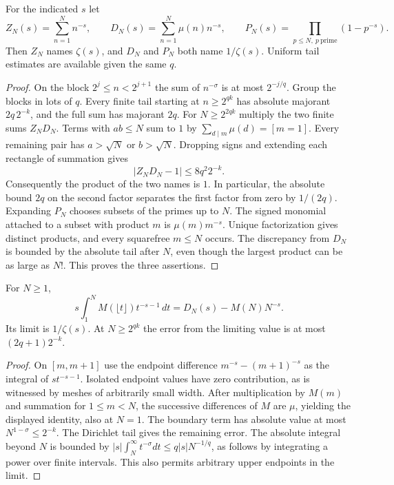 \begin{theorem}
For the indicated $s$ let
\[
 Z_N(s)=\sum_{n=1}^N n^{-s},\qquad
 D_N(s)=\sum_{n=1}^N\mu(n)n^{-s},\qquad
 P_N(s)=\prod_{p\le N,\ p\ \mathrm{prime}}(1-p^{-s}).
\]
Then $Z_N$ names $\zeta(s)$, and $D_N$ and $P_N$ both name
$1/\zeta(s)$. Uniform tail estimates are available given the same $q$.
\end{theorem}
\begin{proof}
On the block $2^j\le n<2^{j+1}$ the sum of $n^{-\sigma}$ is at
most $2^{-j/q}$. Group the blocks in lots of $q$. Every finite tail
starting at $n\ge2^{qk}$ has absolute majorant $2q\,2^{-k}$,
and the full sum has majorant $2q$. For $N\ge2^{2qk}$ multiply
the two finite sums $Z_N D_N$. Terms with $ab\le N$ sum to $1$ by
$\sum_{d\mid m}\mu(d)=[m=1]$. Every remaining pair has
$a>\sqrt N$ or $b>\sqrt N$. Dropping signs and extending each
rectangle of summation gives
\[
                 |Z_N D_N-1|\le 8q^2 2^{-k}.
\]
Consequently the product of the two names is $1$. In particular, the
absolute bound $2q$ on the second factor separates the first factor
from zero by $1/(2q)$. Expanding $P_N$ chooses subsets of the primes
up to $N$. The signed monomial attached to a subset with product $m$
is $\mu(m)m^{-s}$. Unique factorization gives distinct products,
and every squarefree $m\le N$ occurs. The discrepancy from $D_N$
is bounded by the absolute tail after $N$, even though the largest
product can be as large as $N!$. This proves the three assertions.
\end{proof}

\begin{theorem}
For $N\ge1$,
\[
 s\int_1^{N} M(\lfloor t\rfloor)t^{-s-1}\,dt
      =D_N(s)-M(N)N^{-s}.
\]
Its limit is $1/\zeta(s)$. At $N\ge2^{qk}$ the error from the
limiting value is at most $(2q+1)2^{-k}$.
\end{theorem}
\begin{proof}
On $[m,m+1]$ use the endpoint difference $m^{-s}-(m+1)^{-s}$ as
the integral of $s t^{-s-1}$. Isolated endpoint values have zero
contribution, as is witnessed by meshes of arbitrarily small width.
After multiplication by $M(m)$ and summation for $1\le m<N$, the
successive differences of $M$ are $\mu$, yielding the displayed
identity, also at $N=1$. The boundary term has absolute value at most
$N^{1-\sigma}\le2^{-k}$. The Dirichlet tail gives the remaining
error. The absolute integral beyond $N$ is bounded by
$|s|\int_N^\infty t^{-\sigma}dt\le q|s|N^{-1/q}$, as follows by
integrating a power over finite intervals. This also permits arbitrary
upper endpoints in the limit.
\end{proof}

